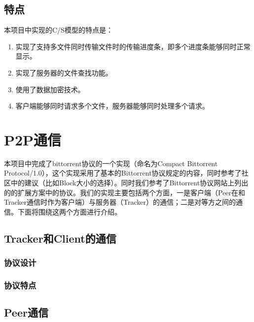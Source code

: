 \documentclass[15pt]{ctexart}
\begin{document}
\subsection{特点} %
\label{sub:特点}
本项目中实现的C/S模型的特点是：
\begin{enumerate}
	\item 实现了支持多文件同时传输文件时的传输进度条，即多个进度条能够同时正常显示。
	\item 实现了服务器的文件查找功能。
	\item 使用了数据加密技术。
	\item 客户端能够同时请求多个文件，服务器能够同时处理多个请求。
\end{enumerate}


\section{P2P通信} %
\label{sec:p2p通信}
	本项目中完成了bittorrent协议的一个实现（命名为Compact Bittorrent Protocol/1.0），这个实现采用了基本的Bittorrent协议规定的内容，同时参考了社区中的建议（比如Block大小的选择）。同时我们参考了Bittorrent协议网站上列出的的扩展方案中的协议。我们的实现主要包括两个方面，一是客户端（Peer在和Tracker通信时作为客户端）与服务器（Tracker）的通信；二是对等方之间的通信。下面将围绕这两个方面进行介绍。
	\subsection{Tracker和Client的通信} %
	\label{sub:tracker_和_client}

		\subsubsection{协议设计} %
		\label{ssub:协议设计}
		
		\subsubsection{协议特点} %
		\label{ssub:协议特点}
		
	\subsection{Peer通信} %
	\label{sub:peer通信}
		
\end{document}
